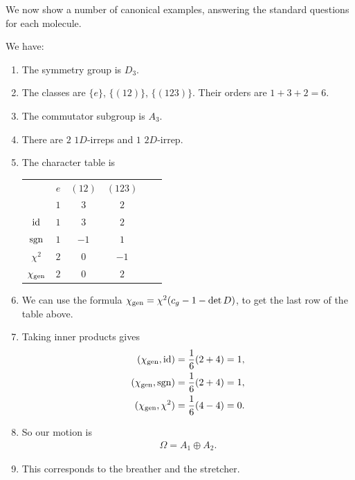 \documentclass[11pt]{article}
\begin{document}
We now show a number of canonical examples, answering the standard
questions for each molecule.

\begin{eexample}
    [Triangle]
    We have:
    \begin{enumerate}
        \item The symmetry group is $D_3$.
        \item The classes are $\{ e \}$, $\{ (12) \}$, $\{ (123) \}$.
        Their orders are $1 + 3 + 2 = 6$.
        \item The commutator subgroup is $A_3$.
        \item There are $2$ $1D$-irreps and $1$ $2D$-irrep.
        \item The character table is
        \begin{table}[H]
            \centering
            \begin{tabular}{|c|c|c|c|c|c|}
                \hline
                 & $e$ & $(12)$ & $(123)$\\
                 & $1$ & $3$ & $2$\\
                \hline
                $\id$ & $1$ & $3$ & $2$\\
                ${\rm sgn}$ & $1$ & $-1$ & $1$\\
                $\chi^2$ & $2$ & $0$ & $-1$\\
                $\chi_{\rm gen}$ & $2$ & $0$ & $2$\\
                \hline
            \end{tabular}
        \end{table}
        \item We can use the formula $\chi_{\rm gen} = \chi^2 (c_g - 1 - \det{D})$,
        to get the last row of the table above.
        \item Taking inner products gives
        \begin{align*}
            (\chi_{\rm gen}, \id) & = \frac{1}{6} (2 + 4) = 1,\\
            (\chi_{\rm gen}, \sgn) & = \frac{1}{6} (2 + 4) = 1,\\
            (\chi_{\rm gen}, \chi^2) & = \frac{1}{6} (4 - 4) = 0.
        \end{align*}
        \item So our motion is
        \begin{align*}
            \boxed{\Omega = A_1 \oplus A_2.}
        \end{align*}
        \item This corresponds to the breather and the stretcher.
    \end{enumerate}
\end{eexample}
\end{document}
